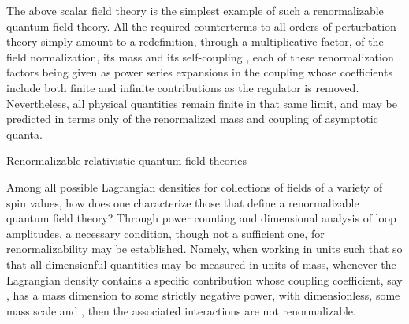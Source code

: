 \documentclass[a4paper,11pt]{article}
\begin{document}
The above \coordHE{} scalar field theory is the simplest example
of such a renormalizable quantum field theory. All the required counterterms
to all orders of perturbation theory simply amount to a redefinition, through 
a multiplicative factor, of the field normalization, its mass \coordHE{} and its
self-coupling \myHighlight{$\lambda$}\coordHE{}, each of these renormalization factors being given
as power series expansions in the coupling \myHighlight{$\lambda$}\coordHE{} whose coefficients
include both finite and infinite contributions as the regulator is
removed. Nevertheless, all physical quantities remain finite in that same 
limit, and may be predicted in terms only of the renormalized mass and 
coupling of asymptotic quanta.


\vspace{10pt}

\noindent\underline{Renormalizable relativistic quantum field theories}

\vspace{5pt}

Among all possible Lagrangian densities for collections of fields of
a variety of spin values, how does one characterize those that define
a renormalizable quantum field theory? Through power counting and
dimensional analysis of loop amplitudes, a necessary
condition, though not a sufficient one, for renormalizability may be
established. Namely, when working in units such that \coordHE{}
so that all dimensionful quantities may be measured in units of mass,
whenever the Lagrangian density contains a specific contribution
whose coupling coefficient, say \myHighlight{$\lambda$}\coordHE{}, has a mass dimension to some 
strictly negative power, \coordHE{} with \coordHE{}
dimensionless, \myHighlight{$\Lambda$}\coordHE{} some mass scale and \coordHE{}, then the associated 
interactions are not renormalizable.
\end{document}
